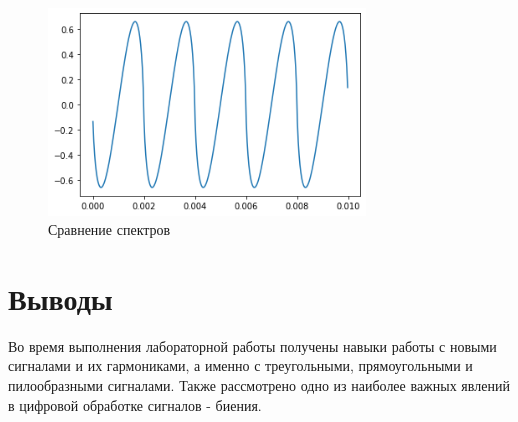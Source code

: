 \documentclass[a4paper,12pt]{report}
\begin{document}
\begin{figure}[H]
        \centering
        \includegraphics[width=0.75\textwidth]{lab2_fig6_3.png}
        \caption{Сравнение спектров}
        \label{fig:lab2_fig6_3}
\end{figure}

\chapter{Выводы}

Во время выполнения лабораторной работы получены навыки работы с новыми сигналами и их гармониками, а именно с треугольными, прямоугольными и пилообразными сигналами. Также рассмотрено одно из наиболее важных явлений в цифровой обработке сигналов - биения.
\end{document}
